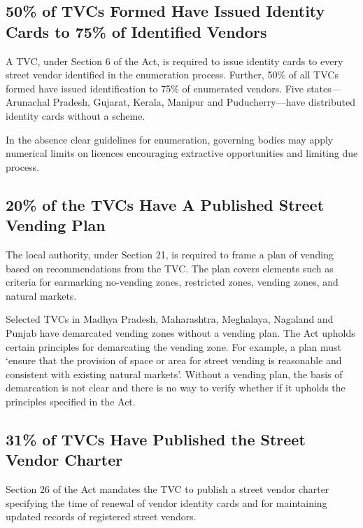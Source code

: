 \documentclass[a4paper, 12pt, twoside]{article}
\begin{document}
{\subsection*{50\% of TVCs Formed Have Issued Identity Cards to 75\% of Identified Vendors}

	A TVC, under Section 6 of the Act, is required to issue identity cards to every street vendor identified in the enumeration process. Further, 50\% of all TVCs formed have issued identification to 75\% of enumerated vendors. Five states—Arunachal Pradesh, Gujarat, Kerala, Manipur and Puducherry—have distributed identity cards without a scheme.

	In the absence clear guidelines for enumeration, governing bodies may apply numerical limits on licences encouraging extractive opportunities and limiting due process.

\subsection*{20\% of the TVCs Have A Published Street Vending Plan}
	The local authority, under Section 21, is required to frame a plan of vending based on recommendations from the TVC. The plan covers elements such as criteria for earmarking no-vending zones, restricted zones, vending zones, and natural markets.

	Selected TVCs in Madhya Pradesh, Maharashtra, Meghalaya, Nagaland and Punjab have demarcated vending zones without a vending plan. The Act upholds certain principles for demarcating the vending zone. For example, a plan must `ensure that the provision of space or area for street vending is reasonable and consistent with existing natural markets'. Without a vending plan, the basis of demarcation is not clear and there is no way to verify whether if it upholds the principles specified in the Act.

\subsection*{31\% of TVCs Have Published the Street Vendor Charter}
	Section 26 of the Act mandates the TVC to publish a street vendor charter specifying the time of renewal of vendor identity cards and for maintaining updated records of registered street vendors.

}
\end{document}
